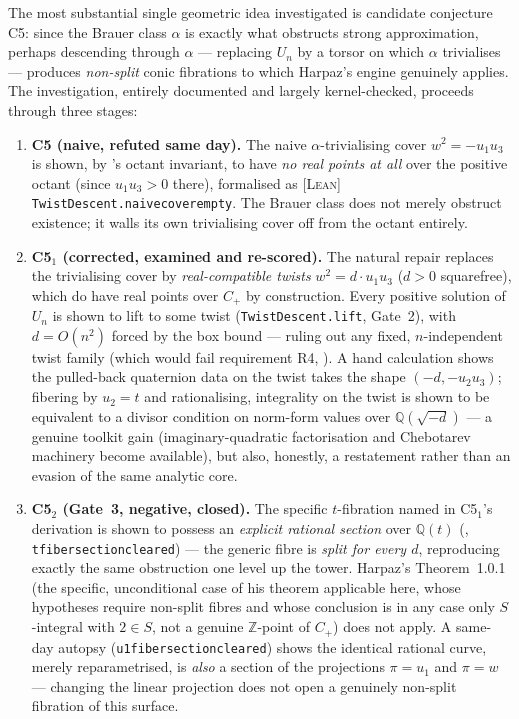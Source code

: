 \documentclass[11pt]{article}
\theoremstyle{plain}
\theoremstyle{definition}
\theoremstyle{remark}
\newcommand{\LEAN}{\textcolor{proved}{\textsc{[Lean]}}}
\newcommand{\lean}[1]{\texttt{#1}}
\renewcommand{\_}{\textunderscore\allowbreak}
\newcommand{\Z}{\mathbb{Z}}
\newcommand{\Q}{\mathbb{Q}}
\begin{document}
The most substantial single geometric idea investigated is candidate conjecture C5: since the
Brauer class $\alpha$ is exactly what obstructs strong approximation, perhaps descending through
$\alpha$ — replacing $U_n$ by a torsor on which $\alpha$ trivialises — produces \emph{non-split}
conic fibrations to which Harpaz's engine genuinely applies. The investigation, entirely
documented and largely kernel-checked, proceeds through three stages:
\begin{enumerate}[leftmargin=1.6em]
  \item \textbf{C5 (naive, refuted same day).} The naive $\alpha$-trivialising cover
        $w^2=-u_1u_3$ is shown, by 's octant invariant, to have
        \emph{no real points at all} over the positive octant (since $u_1u_3>0$ there),
        formalised as \LEAN{} \lean{TwistDescent.naive\_cover\_empty}. The Brauer class does not
        merely obstruct existence; it walls its own trivialising cover off from the octant
        entirely.
  \item \textbf{C5$_1$ (corrected, examined and re-scored).} The natural repair replaces the
        trivialising cover by \emph{real-compatible twists} $w^2=d\cdot u_1u_3$ ($d>0$
        squarefree), which do have real points over $C_+$ by construction. Every positive
        solution of $U_n$ is shown to lift to some twist (\lean{TwistDescent.lift}, Gate~2), with
        $d=O(n^2)$ forced by the box bound — ruling out any fixed, $n$-independent twist family
        (which would fail requirement R4, ). A hand calculation shows the
        pulled-back quaternion data on the twist takes the shape $(-d,-u_2u_3)$; fibering by
        $u_2=t$ and rationalising, integrality on the twist is shown to be equivalent to a
        divisor condition on norm-form values over $\Q(\sqrt{-d})$ — a genuine toolkit gain
        (imaginary-quadratic factorisation and Chebotarev machinery become available), but also,
        honestly, a restatement rather than an evasion of the same analytic core.
  \item \textbf{C5$_2$ (Gate~3, negative, closed).} The specific $t$-fibration named in C5$_1$'s
        derivation is shown to possess an \emph{explicit rational section} over $\Q(t)$
        (, \lean{t\_fiber\_section\_cleared}) — the generic fibre is
        \emph{split for every $d$}, reproducing exactly the same obstruction one level up the
        tower. Harpaz's Theorem~1.0.1 (the specific, unconditional case of his theorem
        applicable here, whose hypotheses require non-split fibres and whose conclusion is in
        any case only $S$-integral with $2\in S$, not a genuine $\Z$-point of $C_+$) does not
        apply. A same-day autopsy (\lean{u1\_fiber\_section\_cleared}) shows the identical
        rational curve, merely reparametrised, is \emph{also} a section of the projections
        $\pi=u_1$ and $\pi=w$ — changing the linear projection does not open a genuinely
        non-split fibration of this surface.
\end{enumerate}
\end{document}
